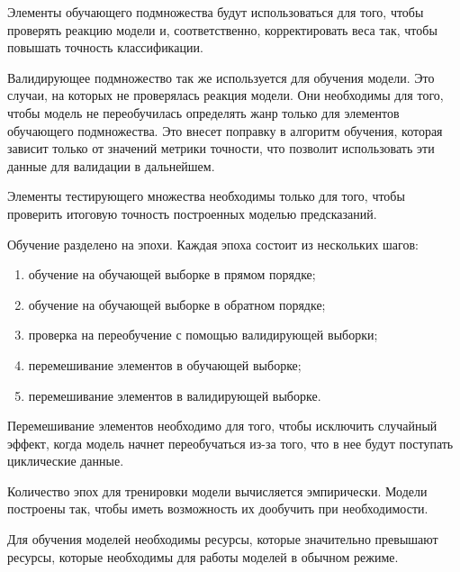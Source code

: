Элементы обучающего подмножества будут использоваться для того, чтобы проверять реакцию модели и, соответственно, корректировать веса так, чтобы повышать точность классификации.

Валидирующее подмножество так же используется для обучения модели. Это случаи, на которых не проверялась реакция модели. Они необходимы для того, чтобы модель не переобучилась определять жанр только для элементов обучающего подмножества. Это внесет поправку в алгоритм обучения, которая зависит только от значений метрики точности, что позволит использовать эти данные для валидации в дальнейшем.

Элементы тестирующего множества необходимы только для того, чтобы проверить итоговую точность построенных моделью предсказаний.

Обучение разделено на эпохи. Каждая эпоха состоит из нескольких шагов:
\begin{enumerate}
  \item обучение на обучающей выборке в прямом порядке;
  \item обучение на обучающей выборке в обратном порядке;
  \item проверка на переобучение с помощью валидирующей выборки;
  \item перемешивание элементов в обучающей выборке;
  \item перемешивание элементов в валидирующей выборке.
\end{enumerate}

Перемешивание элементов необходимо для того, чтобы исключить \linebreak случайный эффект, когда модель начнет переобучаться из-за того, что в нее будут поступать циклические данные.

Количество эпох для тренировки модели вычисляется эмпирически. Модели построены так, чтобы иметь возможность их дообучить при необходимости.

Для обучения моделей необходимы ресурсы, которые значительно превышают ресурсы, которые необходимы для работы моделей в обычном режиме.

